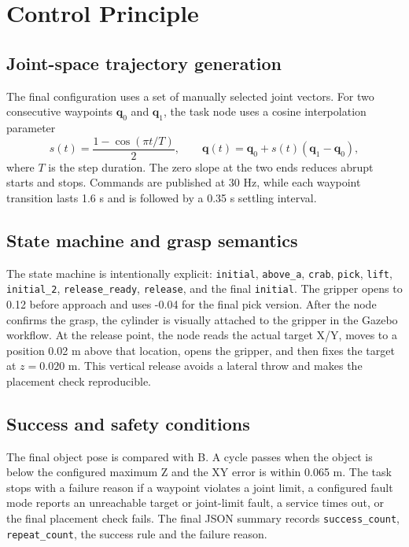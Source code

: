 \documentclass[11pt,a4paper]{article}
\newcommand{\code}[1]{\texttt{\footnotesize #1}}
\begin{document}
\section{Control Principle}
\subsection{Joint-space trajectory generation}
The final configuration uses a set of manually selected joint vectors. For two consecutive waypoints $\mathbf q_0$ and $\mathbf q_1$, the task node uses a cosine interpolation parameter
\[
s(t)=\frac{1-\cos(\pi t/T)}{2},\qquad \mathbf q(t)=\mathbf q_0+s(t)(\mathbf q_1-\mathbf q_0),
\]
where $T$ is the step duration. The zero slope at the two ends reduces abrupt starts and stops. Commands are published at 30 Hz, while each waypoint transition lasts 1.6 s and is followed by a 0.35 s settling interval.

\subsection{State machine and grasp semantics}
The state machine is intentionally explicit: \code{initial}, \code{above\_a}, \code{crab}, \code{pick}, \code{lift}, \code{initial\_2}, \code{release\_ready}, \code{release}, and the final \code{initial}. The gripper opens to 0.12 before approach and uses -0.04 for the final pick version. After the node confirms the grasp, the cylinder is visually attached to the gripper in the Gazebo workflow. At the release point, the node reads the actual target X/Y, moves to a position 0.02 m above that location, opens the gripper, and then fixes the target at $z=0.020$ m. This vertical release avoids a lateral throw and makes the placement check reproducible.

\subsection{Success and safety conditions}
The final object pose is compared with B. A cycle passes when the object is below the configured maximum Z and the XY error is within 0.065 m. The task stops with a failure reason if a waypoint violates a joint limit, a configured fault mode reports an unreachable target or joint-limit fault, a service times out, or the final placement check fails. The final JSON summary records \code{success\_count}, \code{repeat\_count}, the success rule and the failure reason.
\end{document}
